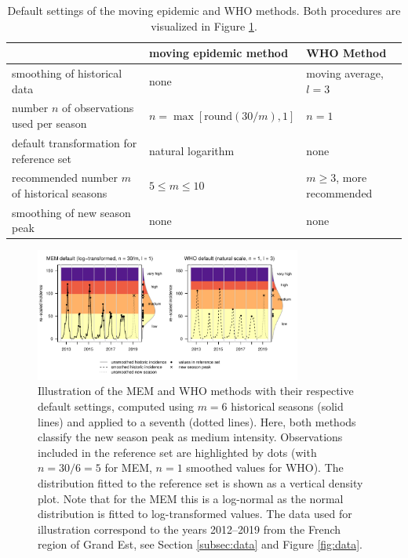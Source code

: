 \documentclass[12pt]{article}
\begin{document}
\begin{table}[h]
\caption{Default settings of the moving epidemic and WHO methods. Both procedures are visualized in Figure \ref{fig:illustration}.}
\label{tab:differences}
\begin{center}
\footnotesize
\begin{tabular}{lll}
\toprule
& moving epidemic method & WHO Method \\
\midrule
smoothing of historical data & none & moving average, $l = 3$\\
number $n$ of observations used per season & $n = \max[\text{round}(30/m), 1]$ & $n = 1$\\
default transformation for reference set & natural logarithm & none\\
recommended number $m$ of historical seasons & $5 \leq m \leq 10$ & $m \geq 3$, more recommended\\
smoothing of new season peak & none & none\\
\bottomrule
\end{tabular}
\end{center}

\end{table}


\begin{figure}
\begin{center}
\includegraphics[width = 0.78\textwidth]{figure/illustration_mem_who.pdf}
\end{center}
\caption{Illustration of the MEM and WHO methods with their respective default settings, computed using $m = 6$ historical seasons (solid lines) and applied to a seventh (dotted lines). Here, both methods classify the new season peak as medium intensity. Observations included in the reference set are highlighted by dots (with $n = 30/6 = 5$ for MEM, $n = 1$ smoothed values for WHO). The distribution fitted to the reference set is shown as a vertical density plot. Note that for the MEM this is a log-normal as the normal distribution is fitted to log-transformed values. The data used for illustration correspond to the years 2012--2019 from the French region of Grand Est, see Section \ref{subsec:data} and Figure \ref{fig:data}.}
\label{fig:illustration}
\end{figure}
\end{document}
